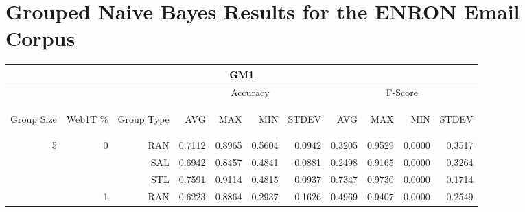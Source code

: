 \chapter{Grouped Naive Bayes Results for the ENRON Email Corpus}

\begin{center}
\begin{table}[htbp] 
 \begin{center}
\begin{tabular}{ | r | r | r | r | r | r | r | r | r | r | r |}
\hline
\multicolumn{11}{|c|}{GM1}\\
\hline
 & & & \multicolumn{4}{|c|}{Accuracy} & \multicolumn{4}{|c|}{F-Score}\\ \cline{4-11}
\begin{sideways}Group Size\end{sideways} & \begin{sideways}Web1T \%\end{sideways} & \begin{sideways}Group Type\end{sideways} & \begin{sideways}AVG\end{sideways} & \begin{sideways}MAX\end{sideways} & \begin{sideways}MIN\end{sideways} & \begin{sideways}STDEV\end{sideways} & \begin{sideways}AVG\end{sideways} & \begin{sideways}MAX\end{sideways} & \begin{sideways}MIN\end{sideways} & \begin{sideways}STDEV\end{sideways}\\
\hline
\multirow{18}{*}{5}
 & \multirow{3}{*}{0} & RAN & 0.7112 & 0.8965 & 0.5604 & 0.0942 & 0.3205 & 0.9529 & 0.0000 & 0.3517\\ \cline{3-11}
 &   & SAL & 0.6942 & 0.8457 & 0.4841 & 0.0881 & 0.2498 & 0.9165 & 0.0000 & 0.3264\\ \cline{3-11}
 &   & STL & 0.7591 & 0.9114 & 0.4815 & 0.0937 & 0.7347 & 0.9730 & 0.0000 & 0.1714\\ \cline{2-11}
 & \multirow{3}{*}{1} & RAN & 0.6223 & 0.8864 & 0.2937 & 0.1626 & 0.4969 & 0.9407 & 0.0000 & 0.2549\\ \cline{3-11}

\end{tabular}
\end{center}
\end{table}
\end{center}
